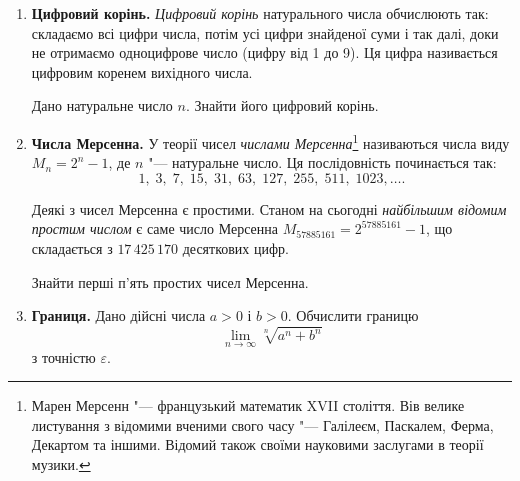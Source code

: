 \begin{enumerate}
\item \textbf{Цифровий корінь.} {\itshape Цифровий корінь} натурального числа обчислюють так: складаємо всі цифри числа, потім усі цифри знайденої суми і так далі, доки не отримаємо одноцифрове число (цифру від 1 до 9). Ця цифра називається цифровим коренем вихідного числа.

Дано натуральне число $n$. Знайти його цифровий корінь.

\item \textbf{Числа Мерсенна.} У теорії чисел {\itshape числами Мерсенна}\footnote[1]{Марен Мерсенн "--- французький математик XVII століття. Вів велике листування з відомими вченими свого часу "--- Галілеєм, Паскалем, Ферма, Декартом та іншими. Відомий також своїми науковими заслугами в теорії музики.} називаються числа виду $M_n=2^n-1$, де $n$ "--- натуральне число. Ця послідовність починається так:
$$
1,\; 3,\; 7,\; 15,\; 31,\; 63,\; 127,\; 255,\; 511,\; 1023,\ldots.
$$

Деякі з чисел Мерсенна є простими. Станом на сьогодні {\itshape найбільшим відомим простим числом} є саме число Мерсенна
$M_{57885161}=2^{57885161}-1$, що складається з $17\,425\,170$ десяткових цифр.

Знайти перші п'ять простих чисел Мерсенна.

\item \textbf{Границя.} Дано дійсні числа $a>0$ і $b>0$. Обчислити границю
$$
\lim_{n\to\infty} \sqrt[n]{a^n+b^n}
$$
з точністю $\varepsilon$.
\end{enumerate}






